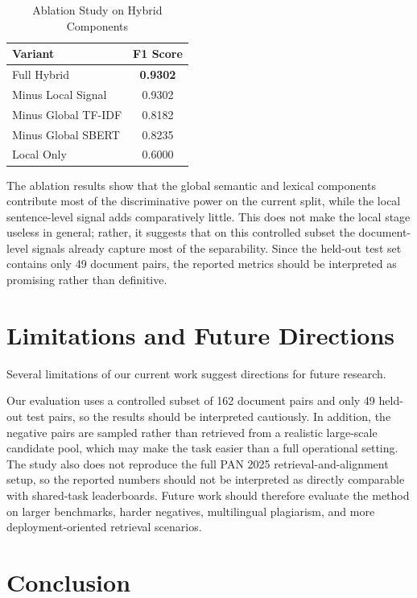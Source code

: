 \documentclass{llncs}
\begin{document}
\begin{table}[htbp]
\caption{Ablation Study on Hybrid Components}
\begin{center}
\begin{tabular}{lc}
\toprule
\textbf{Variant} & \textbf{F1 Score} \\
\midrule
Full Hybrid & \textbf{0.9302} \\
Minus Local Signal & 0.9302 \\
Minus Global TF-IDF & 0.8182 \\
Minus Global SBERT & 0.8235 \\
Local Only & 0.6000 \\
\bottomrule
\end{tabular}
\label{tab:ablation}
\end{center}
\end{table}

The ablation results show that the global semantic and lexical components contribute most of the discriminative power on the current split, while the local sentence-level signal adds comparatively little. This does not make the local stage useless in general; rather, it suggests that on this controlled subset the document-level signals already capture most of the separability. Since the held-out test set contains only 49 document pairs, the reported metrics should be interpreted as promising rather than definitive.

\section{Limitations and Future Directions}

Several limitations of our current work suggest directions for future research.

Our evaluation uses a controlled subset of 162 document pairs and only 49 held-out test pairs, so the results should be interpreted cautiously. In addition, the negative pairs are sampled rather than retrieved from a realistic large-scale candidate pool, which may make the task easier than a full operational setting. The study also does not reproduce the full PAN 2025 retrieval-and-alignment setup, so the reported numbers should not be interpreted as directly comparable with shared-task leaderboards. Future work should therefore evaluate the method on larger benchmarks, harder negatives, multilingual plagiarism, and more deployment-oriented retrieval scenarios.

\section{Conclusion}
\end{document}
